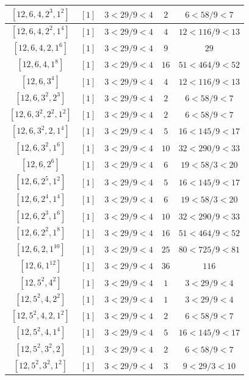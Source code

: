 \documentclass{article}%
\begin{document}
\begin{center}
\begin{longtable}{||c|c|c|c|c||}
$[12, 6, 4, 2^{3}, 1^{2}]$ & $[1]$ & $3 < 29/9 < 4$ & $2$ & $6 < 58/9 < 7$ \\ \hline 
$[12, 6, 4, 2^{2}, 1^{4}]$ & $[1]$ & $3 < 29/9 < 4$ & $4$ & $12 < 116/9 < 13$ \\ \hline 
$[12, 6, 4, 2, 1^{6}]$ & $[1]$ & $3 < 29/9 < 4$ & $9$ & $29$ \\ \hline 
$[12, 6, 4, 1^{8}]$ & $[1]$ & $3 < 29/9 < 4$ & $16$ & $51 < 464/9 < 52$ \\ \hline 
$[12, 6, 3^{4}]$ & $[1]$ & $3 < 29/9 < 4$ & $4$ & $12 < 116/9 < 13$ \\ \hline 
$[12, 6, 3^{2}, 2^{3}]$ & $[1]$ & $3 < 29/9 < 4$ & $2$ & $6 < 58/9 < 7$ \\ \hline 
$[12, 6, 3^{2}, 2^{2}, 1^{2}]$ & $[1]$ & $3 < 29/9 < 4$ & $2$ & $6 < 58/9 < 7$ \\ \hline 
$[12, 6, 3^{2}, 2, 1^{4}]$ & $[1]$ & $3 < 29/9 < 4$ & $5$ & $16 < 145/9 < 17$ \\ \hline 
$[12, 6, 3^{2}, 1^{6}]$ & $[1]$ & $3 < 29/9 < 4$ & $10$ & $32 < 290/9 < 33$ \\ \hline 
$[12, 6, 2^{6}]$ & $[1]$ & $3 < 29/9 < 4$ & $6$ & $19 < 58/3 < 20$ \\ \hline 
$[12, 6, 2^{5}, 1^{2}]$ & $[1]$ & $3 < 29/9 < 4$ & $5$ & $16 < 145/9 < 17$ \\ \hline 
$[12, 6, 2^{4}, 1^{4}]$ & $[1]$ & $3 < 29/9 < 4$ & $6$ & $19 < 58/3 < 20$ \\ \hline 
$[12, 6, 2^{3}, 1^{6}]$ & $[1]$ & $3 < 29/9 < 4$ & $10$ & $32 < 290/9 < 33$ \\ \hline 
$[12, 6, 2^{2}, 1^{8}]$ & $[1]$ & $3 < 29/9 < 4$ & $16$ & $51 < 464/9 < 52$ \\ \hline 
$[12, 6, 2, 1^{10}]$ & $[1]$ & $3 < 29/9 < 4$ & $25$ & $80 < 725/9 < 81$ \\ \hline 
$[12, 6, 1^{12}]$ & $[1]$ & $3 < 29/9 < 4$ & $36$ & $116$ \\ \hline 
$[12, 5^{2}, 4^{2}]$ & $[1]$ & $3 < 29/9 < 4$ & $1$ & $3 < 29/9 < 4$ \\ \hline 
$[12, 5^{2}, 4, 2^{2}]$ & $[1]$ & $3 < 29/9 < 4$ & $1$ & $3 < 29/9 < 4$ \\ \hline 
$[12, 5^{2}, 4, 2, 1^{2}]$ & $[1]$ & $3 < 29/9 < 4$ & $2$ & $6 < 58/9 < 7$ \\ \hline 
$[12, 5^{2}, 4, 1^{4}]$ & $[1]$ & $3 < 29/9 < 4$ & $5$ & $16 < 145/9 < 17$ \\ \hline 
$[12, 5^{2}, 3^{2}, 2]$ & $[1]$ & $3 < 29/9 < 4$ & $2$ & $6 < 58/9 < 7$ \\ \hline 
$[12, 5^{2}, 3^{2}, 1^{2}]$ & $[1]$ & $3 < 29/9 < 4$ & $3$ & $9 < 29/3 < 10$ \\ \hline 

\end{longtable}
\end{center}
\end{document}
